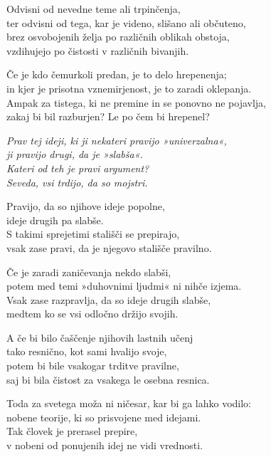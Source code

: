 Odvisni od nevedne teme ali trpinčenja,\\
ter odvisni od tega, kar je videno, slišano ali občuteno,\\
brez osvobojenih želja po različnih oblikah obstoja,\\
vzdihujejo po čistosti v različnih bivanjih.

Če je kdo čemurkoli predan, je to delo hrepenenja;\\
in kjer je prisotna vznemirjenost, je to zaradi oklepanja.\\
Ampak za tistega, ki ne premine in se ponovno ne pojavlja,\\
zakaj bi bil razburjen? Le po čem bi hrepenel?

\emph{Prav tej ideji, ki ji nekateri pravijo »univerzalna«,}\\
\emph{ji pravijo drugi, da je »slabša«.}\\
\emph{Kateri od teh je pravi argument?}\\
\emph{Seveda, vsi trdijo, da so mojstri.}

\clearpage

Pravijo, da so njihove ideje popolne,\\
ideje drugih pa slabše.\\
S takimi sprejetimi stališči se prepirajo,\\
vsak zase pravi, da je njegovo stališče pravilno.

Če je zaradi zaničevanja nekdo slabši,\\
potem med temi »duhovnimi ljudmi« ni nihče izjema.\\
Vsak zase razpravlja, da so ideje drugih slabše,\\
medtem ko se vsi odločno držijo svojih.

A če bi bilo čaščenje njihovih lastnih učenj\\
tako resnično, kot sami hvalijo svoje,\\
potem bi bile vsakogar trditve pravilne,\\
saj bi bila čistost za vsakega le osebna resnica.

Toda za svetega moža ni ničesar, kar bi ga lahko vodilo:\\
nobene teorije, ki so prisvojene med idejami.\\
Tak človek je prerasel prepire,\\
v nobeni od ponujenih idej ne vidi vrednosti.

